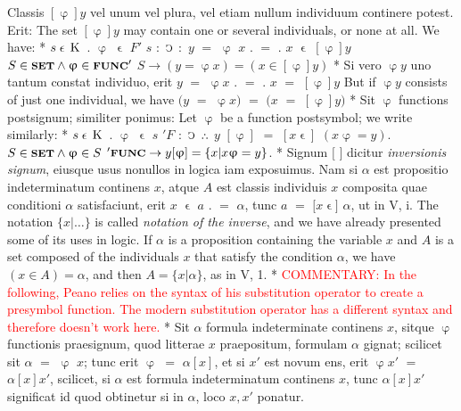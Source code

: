 \documentclass{book}
\newcommand{\C}{\mathop{\sbox0{$\displaystyle$$\reflectbox{C}$} %
\raisebox{-\height+\ht0-0.05cm}[\ht0][\dp0]{\scalebox{0.8}[0.8]{\copy0}}}\displaylimits} %
\newcommand{\pppNoSpace}{\leavevmode\lower0ex\hbox{.}\kern-0.1em\raise0.7ex\hbox{.}\kern-0.1em\lower0ex\hbox{.}} %
\newcommand{\smallIn}{\ensuremath{\mathrel{\epsilon}}}
\newcommand{\K}{\mathop{\thinspace \text{K} \thinspace}}
\newcommand{\setOfSets}{\mathord{\text{{\footnotesize \textbf{SET}}}}}
\newcommand{\func}{\mathord{\text{{\footnotesize \textbf{FUNC}}}}}
\newcommand\commentary[1]{\textcolor{red}{COMMENTARY: #1}}
\newenvironment{translateTwoCol}
               { %
                 \columnratio{0.5, 0.5}
                 \begin{paracol}{2}
                 \newcommand{\LAT}{\switchcolumn[0]*}
                 \newcommand{\ENG}{\switchcolumn[1]}
               }
               { %
                 \let\ENG\undefined
                 \let\LAT\undefined
                 \end{paracol}
               }
\begin{document}
\begin{translateTwoCol}
Classis $[\upvarphi] y$ vel unum vel plura, vel etiam nullum individuum continere potest. Erit:
\ENG
The set $[\upvarphi] y$ may contain one or several individuals, or none at all. We have:
\LAT
\hspace{1.06cm} $s \smallIn \K$ $.$ $\upvarphi$ $\smallIn$ $F'$ $s$ $:$ $\C$ $:$ $y$ $=$ $\upvarphi$ $x$ $.$ $=$ $.$ $x$ $\smallIn$ $[\upvarphi] y$
\ENG
\hspace{1.06cm} $S \in \setOfSets \wedge \upvarphi \in \func'$ $S \rightarrow (y = \upvarphi x)=(x \in [\upvarphi] y)$
\LAT
Si vero $\upvarphi y$ uno tantum constat individuo, erit $y$ $=$ $\upvarphi x$ $.$ $=$ $.$ $x$ $=$ $[\upvarphi] y$
\ENG
But if $\upvarphi y$ consists of just one individual, we have $(y$ $=$ $\upvarphi x)$ $=$ $(x$ $=$ $[\upvarphi] y)$
\LAT
Sit $\upvarphi$ functions postsignum; similiter ponimus:
\ENG
Let $\upvarphi$ be a function postsymbol; we write similarly:
\LAT
\hspace{1.06cm} $s \smallIn \K$ $.$ $\upvarphi$ $\smallIn$ $s$ $'F$ $:$ $\C$ $\pppNoSpace$ $y$ $[ \upvarphi ]$ $=$ $[ x\smallIn ]$ $(x \upvarphi = y)$.  %
\ENG
\hspace{1.06cm} $S \in \setOfSets \wedge \upvarphi \in S$ $'\func \rightarrow y [ \upvarphi ] = \{ x | x \upvarphi = y\}$.
\LAT
Signum $[$ $]$ dicitur \emph{inversionis signum}, eiusque usus nonullos in logica iam exposuimus. Nam si $\alpha$ est propositio indeterminatum continens $x$, atque $A$ est classis individuis $x$ composita quae conditioni $\alpha$ satisfaciunt, erit $x$ $\smallIn$ $a$ $.$ $=$ $\alpha$, tunc $a$ $=$ $[x$\smallIn$]$ $\alpha$, ut in V, i.
\ENG
The notation $\{ x | \ldots \}$ is called \emph{notation of the inverse}, and we have already presented some of its uses in logic. If $\alpha$ is a proposition containing the variable $x$ and $A$ is a set composed of the individuals $x$ that satisfy the condition $\alpha$, we have $(x \in A) = \alpha$, and then $A = \{ x | \alpha \}$, as in V, 1. %
\LAT
\ENG
\commentary{In the following, Peano relies on the syntax of his substitution operator to create a presymbol function.  The modern substitution operator has a different syntax and therefore doesn't work here.}
\LAT
Sit $\alpha$ formula indeterminate continens $x$, sitque $\upvarphi$ functionis praesignum, quod litterae $x$ praepositum, formulam $\alpha$ gignat; scilicet sit $\alpha$ $=$ $\upvarphi$ $x$; tunc erit $\upvarphi$ $=$ $\alpha [x]$, et si $x'$ est novum ens, erit $\upvarphi x'$ $=$ $\alpha [x] x'$, scilicet, si $\alpha$ est formula indeterminatum continens $x$, tunc $\alpha [x] x'$ significat id quod obtinetur si in $\alpha$, loco $x, x'$ ponatur.

\end{translateTwoCol}
\end{document}
